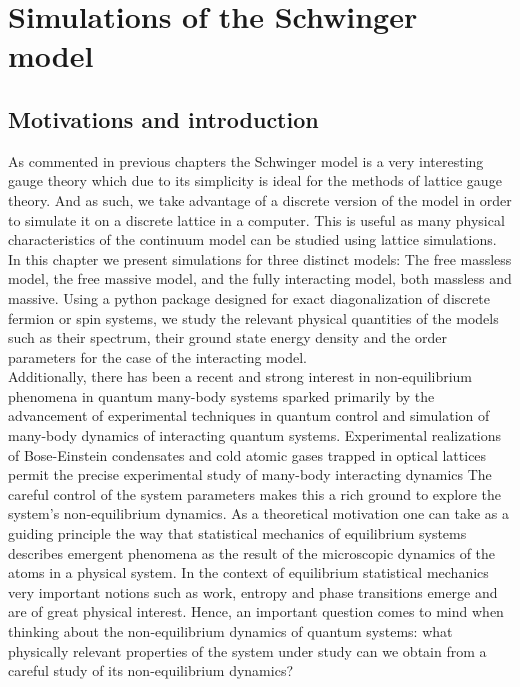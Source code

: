 \chapter{Simulations of the Schwinger model}

\section{Motivations and introduction}

As commented in previous chapters the Schwinger model is a very interesting gauge theory which due to its simplicity is ideal for the methods of lattice gauge theory. And as such, we take advantage of a discrete version of the model in order to simulate it on a discrete lattice in a computer. This is useful as many physical characteristics of the continuum model can be studied using lattice simulations.\\

In this chapter we present simulations for three distinct models: The free massless model, the free massive model, and the fully interacting model, both massless and massive. Using a python package designed for exact diagonalization of discrete fermion or spin systems, we study the relevant physical quantities of the models such as their spectrum, their ground state energy density and the order parameters for the case of the interacting model.\\

Additionally, there has been a recent and strong interest in non-equilibrium phenomena in quantum many-body systems sparked primarily by the advancement of experimental techniques in quantum control and simulation of many-body dynamics of interacting quantum systems. Experimental realizations of Bose-Einstein condensates and cold atomic gases trapped in optical lattices permit the precise experimental study of many-body interacting dynamics The careful control of the system parameters makes this a rich ground to explore the system's non-equilibrium dynamics. As a theoretical motivation one can take as a guiding principle the way that statistical mechanics of equilibrium systems describes emergent phenomena as the result of the microscopic dynamics of the atoms in a physical system. In the context of equilibrium statistical mechanics very important notions such as work, entropy and phase transitions emerge and are of great physical interest. Hence, an important question comes to mind when thinking about the non-equilibrium dynamics of quantum systems: what physically relevant properties of the system under study can we obtain from a careful study of its non-equilibrium dynamics?


